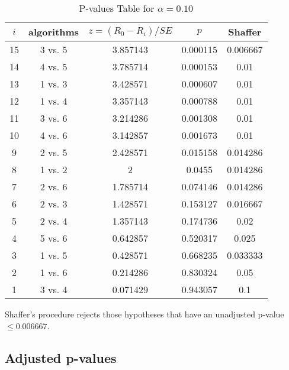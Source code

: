 \documentclass[a4paper,10pt]{article}
\begin{document}
\begin{landscape}
\begin{table}[!htp]
\centering\scriptsize
\begin{tabular}{ccccc}
$i$&algorithms&$z=(R_0 - R_i)/SE$&$p$&Shaffer\\
\hline15&3 vs. 5&3.857143&0.000115&0.006667\\
14&4 vs. 5&3.785714&0.000153&0.01\\
13&1 vs. 3&3.428571&0.000607&0.01\\
12&1 vs. 4&3.357143&0.000788&0.01\\
11&3 vs. 6&3.214286&0.001308&0.01\\
10&4 vs. 6&3.142857&0.001673&0.01\\
9&2 vs. 5&2.428571&0.015158&0.014286\\
8&1 vs. 2&2&0.0455&0.014286\\
7&2 vs. 6&1.785714&0.074146&0.014286\\
6&2 vs. 3&1.428571&0.153127&0.016667\\
5&2 vs. 4&1.357143&0.174736&0.02\\
4&5 vs. 6&0.642857&0.520317&0.025\\
3&1 vs. 5&0.428571&0.668235&0.033333\\
2&1 vs. 6&0.214286&0.830324&0.05\\
1&3 vs. 4&0.071429&0.943057&0.1\\
\hline
\end{tabular}
\caption{P-values Table for $\alpha=0.10$}
\end{table}Shaffer's procedure rejects those hypotheses that have an unadjusted p-value $\le0.006667$.

\pagebreak

\subsection{Adjusted p-values}


\end{landscape}
\end{document}
